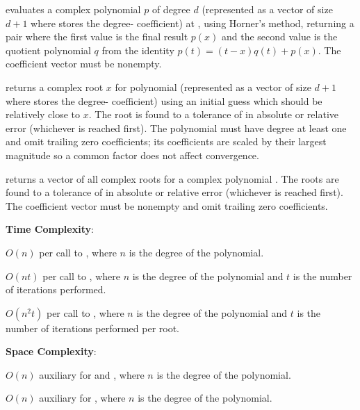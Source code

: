 \begin{compactitem}
  \item {} evaluates a complex polynomial $p$ of degree $d$ (represented as a vector of size $d + 1$ where  stores the degree- coefficient) at , using Horner's method, returning a pair where the first value is the final result $p(x)$ and the second value is the quotient polynomial $q$ from the identity $p(t) = (t - x)q(t) + p(x)$. The coefficient vector must be nonempty.
  \item {} returns a complex root $x$ for polynomial  (represented as a vector of size $d + 1$ where  stores the degree- coefficient) using an initial guess  which should be relatively close to $x$. The root is found to a tolerance of  in absolute or relative error (whichever is reached first). The polynomial must have degree at least one and omit trailing zero coefficients; its coefficients are scaled by their largest magnitude so a common factor does not affect convergence.
  \item {} returns a vector of all complex roots for a complex polynomial . The roots are found to a tolerance of  in absolute or relative error (whichever is reached first). The coefficient vector must be nonempty and omit trailing zero coefficients.
\end{compactitem}

\textbf{Time Complexity}:
\begin{compactitem}
  \item $O(n)$ per call to , where $n$ is the degree of the polynomial.
  \item $O(nt)$ per call to , where $n$ is the degree of the polynomial and $t$ is the number of iterations performed.
  \item $O(n^{2} t)$ per call to , where $n$ is the degree of the polynomial and $t$ is the number of iterations performed per root.
\end{compactitem}

\textbf{Space Complexity}:
\begin{compactitem}
  \item $O(n)$ auxiliary for  and , where $n$ is the degree of the polynomial.
  \item $O(n)$ auxiliary for , where $n$ is the degree of the polynomial.
\end{compactitem}

